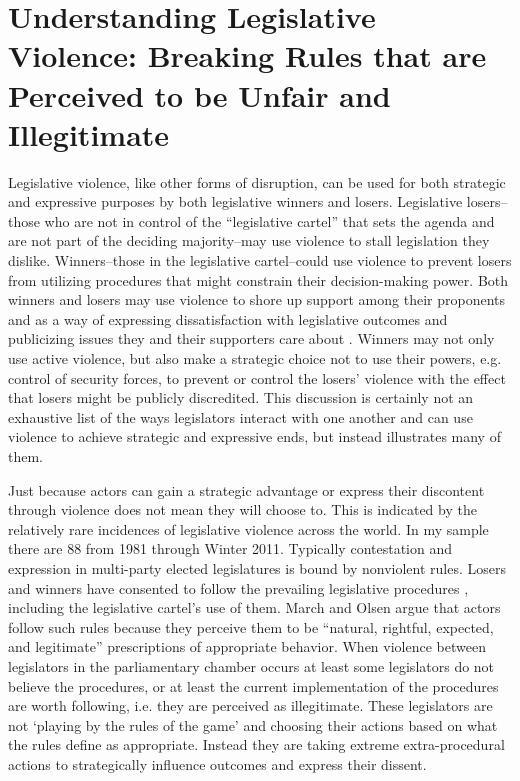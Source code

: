 \documentclass[a4paper]{article}\usepackage{graphicx, color}
\begin{document}

\section{Understanding Legislative Violence: Breaking Rules that are Perceived to be Unfair and Illegitimate}

Legislative violence, like other forms of disruption, can be used for both strategic \citep[see][]{Beaulieu2008} and expressive \citep[see][]{Spary2013} purposes by both legislative winners and losers. Legislative losers--those who are not in control of the ``legislative cartel''  that sets the agenda \citep{cox2007} and are not part of the deciding majority--may use violence to stall legislation they dislike. Winners--those in the legislative cartel--could use violence to prevent losers from utilizing procedures that might constrain their decision-making power. Both winners and losers may use violence to shore up support among their proponents \citep{wilkinson2006} and as a way of expressing dissatisfaction with legislative outcomes and publicizing issues they and their supporters care about \cite[see similar arguments from][]{Spary2013}. Winners may not only use active violence, but also make a strategic choice not to use their powers, e.g. control of security forces, to prevent or control the losers' violence \citep[see the work on ethnic violence in India by][]{wilkinson2006} with the effect that losers might be publicly discredited. This discussion is certainly not an exhaustive list of the ways legislators interact with one another and can use violence to achieve strategic and expressive ends, but instead illustrates many of them.

Just because actors can gain a strategic advantage or express their discontent through violence does not mean they will choose to. This is indicated by the relatively rare incidences of legislative violence across the world. In my sample there are 88 from 1981 through Winter 2011. Typically contestation and expression in multi-party elected legislatures is bound by nonviolent rules. Losers and winners have consented to follow the prevailing legislative procedures \citep[c.f.][]{Anderson2005}, including the legislative cartel's use of them. March and Olsen argue that actors follow such rules because they perceive them to be ``natural, rightful, expected, and legitimate'' \citeyearpar[689]{March2008} prescriptions of appropriate behavior. When violence between legislators in the parliamentary chamber occurs at least some legislators do not believe the procedures, or at least the current implementation of the procedures are worth following, i.e. they are perceived as illegitimate. These legislators are not `playing by the rules of the game' and choosing their actions based on what the rules define as appropriate. Instead they are taking extreme extra-procedural actions to strategically influence outcomes and express their dissent. 
\end{document}
